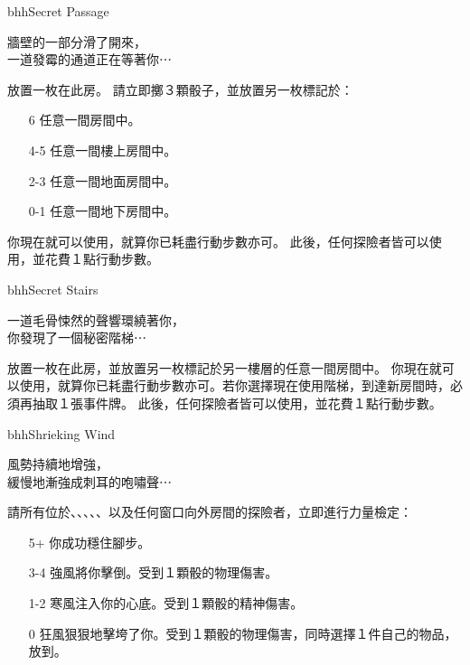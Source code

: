 \linebreak[0]%
\begin{EventCard}{bhh}{Secret Passage}
  \begin{CardStory}
    牆壁的一部分滑了開來，\\
    一道發霉的通道正在等著你⋯
  \end{CardStory}
  放置一枚在此房。\smallbreak
  請立即擲３顆骰子，並放置另一枚標記於：
  \begin{itemize}
    \item[6] 任意一間房間中。
    \item[4-5] 任意一間樓上房間中。
    \item[2-3] 任意一間地面房間中。
    \item[0-1] 任意一間地下房間中。
  \end{itemize}
  你現在就可以使用，就算你已耗盡行動步數亦可。\smallbreak
  此後，任何探險者皆可以使用，並花費１點行動步數。\smallbreak
\end{EventCard}%
\linebreak[0]%
\begin{EventCard}{bhh}{Secret Stairs}
  \begin{CardStory}
    一道毛骨悚然的聲響環繞著你，\\
    你發現了一個秘密階梯⋯
  \end{CardStory}
  放置一枚在此房，並放置另一枚標記於另一樓層的任意一間房間中。\smallbreak
  你現在就可以使用，就算你已耗盡行動步數亦可。若你選擇現在使用階梯，到達新房間時，必須再抽取１張事件牌。\smallbreak
  此後，任何探險者皆可以使用，並花費１點行動步數。\smallbreak
\end{EventCard}%
\linebreak[0]%
\begin{EventCard}{bhh}{Shrieking Wind}
  \begin{CardStory}
    風勢持續地增強，\\
    緩慢地漸強成刺耳的咆嘯聲⋯
  \end{CardStory}
  請所有位於、、、、、以及任何窗口向外房間的探險者，立即進行力量檢定：
  \begin{itemize}
    \item[5+] 你成功穩住腳步。
    \item[3-4] 強風將你擊倒。受到１顆骰的物理傷害。
    \item[1-2] 寒風注入你的心底。受到１顆骰的精神傷害。
    \item[0] 狂風狠狠地擊垮了你。受到１顆骰的物理傷害，同時選擇１件自己的物品，放到。
  \end{itemize}
\end{EventCard}%
